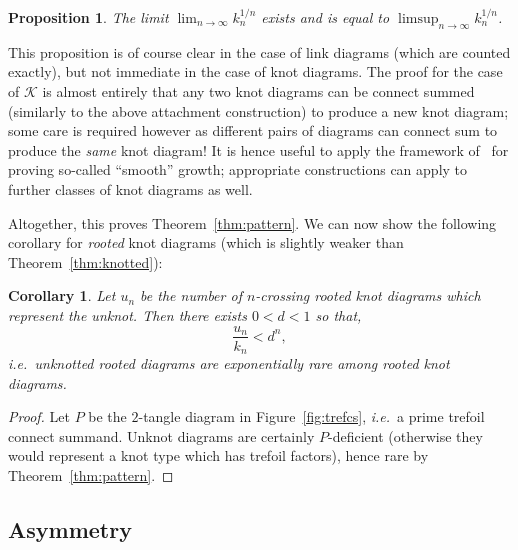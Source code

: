 \documentclass[submission%
]{dmtcs}
\newcommand{\KnotDiaClass}{\mathscr{K}}
\newcommand{\KnotDiaCard}{k}
\newtheorem{corollary}{Corollary}
\newtheorem{proposition}{Proposition}
\begin{document}
\begin{proposition}
  The limit $\lim_{n\to\infty}{\KnotDiaCard_n^{1/n}}$ exists and is
  equal to $\limsup_{n\to\infty}{\KnotDiaCard_n^{1/n}}$.
\end{proposition}

This proposition is of course clear in the case of link diagrams
(which are counted exactly), but not immediate in the case of knot
diagrams. The proof for the case of $\KnotDiaClass$ is almost entirely
that any two knot diagrams can be connect summed (similarly to the
above attachment construction) to produce a new knot diagram; some
care is required however as different pairs of diagrams can connect
sum to produce the \emph{same} knot diagram! It is hence useful to
apply the framework of~\cite{Bender1992104} for proving so-called
``smooth'' growth; appropriate constructions can apply to further
classes of knot diagrams as well.

Altogether, this proves Theorem~\ref{thm:pattern}. We can now show the
following corollary for \emph{rooted} knot diagrams (which is slightly
weaker than Theorem~\ref{thm:knotted}):

\begin{corollary}
  \label{thm:rootknotted}
  Let $u_n$ be the number of $n$-crossing \emph{rooted} knot diagrams which
  represent the unknot. Then there exists $0< d < 1$ so that,
  \begin{displaymath}
    \frac{u_n}{k_n} < d^n,
  \end{displaymath}
  \textit{i.e.}\ unknotted \emph{rooted} diagrams are exponentially
  rare among \emph{rooted} knot diagrams.
\end{corollary}

\begin{proof}
  Let $P$ be the $2$-tangle diagram in Figure~\ref{fig:trefcs},
  \textit{i.e.}\ a prime trefoil connect summand. Unknot diagrams are
  certainly $P$-deficient (otherwise they would represent a knot type
  which has trefoil factors), hence rare by Theorem~\ref{thm:pattern}.
\end{proof}

\subsection{Asymmetry}
\label{sec:asymmetry}
\end{document}
